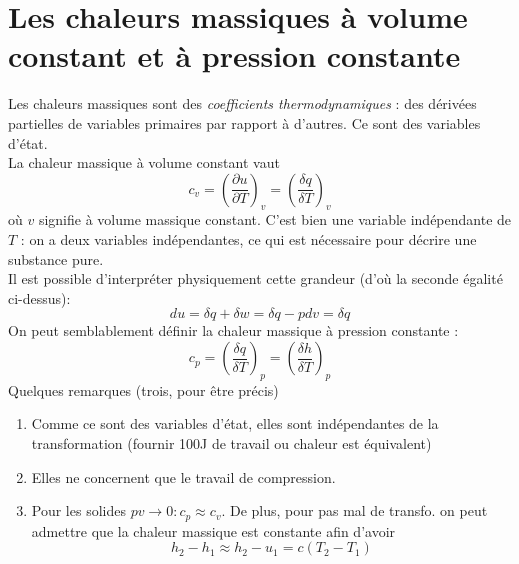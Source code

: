 \section{Les chaleurs massiques à volume constant et à pression 
constante}
Les chaleurs massiques sont des \textit{coefficients thermodynamiques} : 
des dérivées partielles de variables primaires par rapport à d'autres. 
Ce sont des variables d'état. \\
La chaleur massique à volume constant vaut
\begin{equation}
c_v = \left(\frac{\partial u}{\partial T}\right)_v = \left(\frac{\delta 
q}{\delta T}\right)_v
\end{equation}
où $v$ signifie à volume massique constant. C'est bien une variable 
indépendante de $T$ : on a deux variables indépendantes, ce qui est 
nécessaire pour décrire une substance pure.\\
Il est possible d’interpréter physiquement cette grandeur (d'où la 
seconde égalité ci-dessus):
\begin{equation}
du = \delta q + \delta w = \delta q - pdv = \delta q
\end{equation}
On peut semblablement définir la chaleur massique à pression constante :
\begin{equation}
c_p = \left(\frac{\delta q}{\delta T}\right)_p = \left(\frac{\delta h}{
\delta T}\right)_p
\end{equation}
Quelques remarques (trois, pour être précis)
\begin{enumerate}
\item Comme ce sont des variables d'état, elles sont indépendantes de 
la transformation (fournir 100J de travail ou chaleur est équivalent)
\item Elles ne concernent que le travail de compression.
\item Pour les solides $pv \rightarrow 0 : c_p\approx c_v$. De plus, 
pour pas mal de transfo. on peut admettre que la chaleur massique est 
constante afin d'avoir
\begin{equation}
h_2-h_1\approx h_2-u_1 = c(T_2-T_1)
\end{equation}
\end{enumerate}



